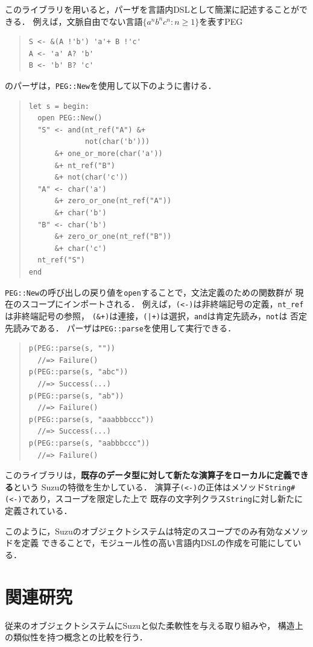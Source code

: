 \documentclass{ipsjprosym}
\begin{document}
このライブラリを用いると，パーザを言語内DSLとして簡潔に記述することができる．
例えば，文脈自由でない言語$\{a^n b^n c^n:n\ge1\}$を表すPEG
\begin{quote}
\begin{verbatim}
S <- &(A !'b') 'a'+ B !'c'
A <- 'a' A? 'b'
B <- 'b' B? 'c'
\end{verbatim}
\end{quote}
のパーザは，\verb|PEG::New|を使用して以下のように書ける．
\begin{quote}
\begin{verbatim}
let s = begin:
  open PEG::New()
  "S" <- and(nt_ref("A") &+
             not(char('b')))
      &+ one_or_more(char('a'))
      &+ nt_ref("B")
      &+ not(char('c'))
  "A" <- char('a')
      &+ zero_or_one(nt_ref("A"))
      &+ char('b')
  "B" <- char('b')
      &+ zero_or_one(nt_ref("B"))
      &+ char('c')
  nt_ref("S")
end
\end{verbatim}
\end{quote}
\verb|PEG::New|の呼び出しの戻り値を\verb|open|することで，文法定義のための関数群が
現在のスコープにインポートされる．
例えば，\verb|(<-)|は非終端記号の定義，\verb|nt_ref|は非終端記号の参照，
\verb|(&+)|は連接，\verb/(|+)/は選択，\verb|and|は肯定先読み，\verb|not|は
否定先読みである．
パーザは\verb|PEG::parse|を使用して実行できる．
\begin{quote}
\begin{verbatim}
p(PEG::parse(s, ""))
  //=> Failure()
p(PEG::parse(s, "abc"))
  //=> Success(...)
p(PEG::parse(s, "ab"))
  //=> Failure()
p(PEG::parse(s, "aaabbbccc"))
  //=> Success(...)
p(PEG::parse(s, "aabbbccc"))
  //=> Failure()
\end{verbatim}
\end{quote}

このライブラリは，\textbf{既存のデータ型に対して新たな演算子をローカルに定義できる}という
Suzuの特徴を生かしている．
演算子\verb|(<-)|の正体はメソッド\verb|String#(<-)|であり，スコープを限定した上で
既存の文字列クラス\verb|String|に対し新たに定義されている．

このように，Suzuのオブジェクトシステムは特定のスコープでのみ有効なメソッドを定義
できることで，モジュール性の高い言語内DSLの作成を可能にしている．

\section{関連研究}

従来のオブジェクトシステムにSuzuと似た柔軟性を与える取り組みや，
構造上の類似性を持つ概念との比較を行う．
\end{document}
